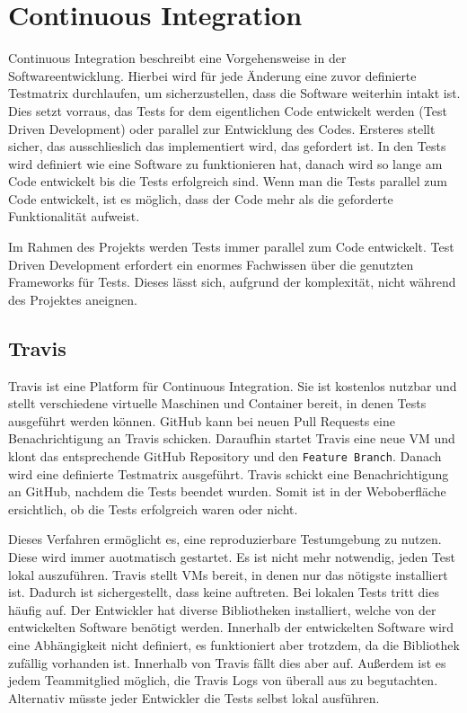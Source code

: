 \section{Continuous Integration}
Continuous Integration beschreibt eine Vorgehensweise in der
Softwareentwicklung. Hierbei wird für jede Änderung eine zuvor definierte
Testmatrix durchlaufen, um sicherzustellen, dass die Software weiterhin intakt
ist. Dies setzt vorraus, das Tests for dem eigentlichen Code entwickelt werden
(Test Driven Development) oder parallel zur Entwicklung des Codes. Ersteres
stellt sicher, das ausschlieslich das implementiert wird, das gefordert ist.
In den Tests wird definiert wie eine Software zu funktionieren hat, danach
wird so lange am Code entwickelt bis die Tests erfolgreich sind. Wenn man die
Tests parallel zum Code entwickelt, ist es möglich, dass der Code mehr als die
geforderte Funktionalität aufweist.

Im Rahmen des Projekts werden Tests immer parallel zum Code entwickelt. Test
Driven Development erfordert ein enormes Fachwissen über die genutzten
Frameworks für Tests. Dieses lässt sich, aufgrund der komplexität, nicht
während des Projektes aneignen.
\tm%

\subsection{Travis}
Travis ist eine Platform für Continuous Integration. Sie ist kostenlos nutzbar
und stellt verschiedene virtuelle Maschinen und Container bereit, in denen
Tests ausgeführt werden können. GitHub kann bei neuen Pull Requests eine
Benachrichtigung an Travis schicken. Daraufhin startet Travis eine neue VM und
klont das entsprechende GitHub Repository und den \texttt{Feature Branch}.
Danach wird eine definierte Testmatrix ausgeführt. Travis schickt eine
Benachrichtigung an GitHub, nachdem die Tests beendet wurden. Somit ist in der
Weboberfläche ersichtlich, ob die Tests erfolgreich waren oder nicht.

Dieses Verfahren ermöglicht es, eine reproduzierbare Testumgebung zu nutzen.
Diese wird immer auotmatisch gestartet. Es ist nicht mehr notwendig, jeden Test
lokal auszuführen. Travis stellt VMs bereit, in denen nur das nötigste
installiert ist. Dadurch ist sichergestellt, dass keine  auftreten. Bei lokalen Tests tritt dies häufig auf. Der
Entwickler hat diverse Bibliotheken installiert, welche von der entwickelten
Software benötigt werden.  Innerhalb der entwickelten Software wird eine
Abhängigkeit nicht definiert, es funktioniert aber trotzdem, da die Bibliothek
zufällig vorhanden ist.  Innerhalb von Travis fällt dies aber auf. Außerdem ist
es jedem Teammitglied möglich, die Travis Logs von überall aus zu begutachten.
Alternativ müsste jeder Entwickler die Tests selbst lokal ausführen.
\tm%

